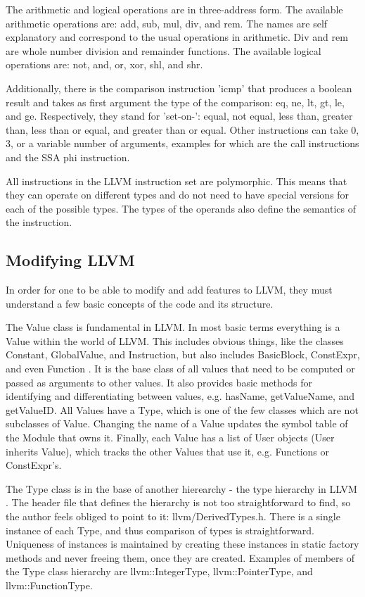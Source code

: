 \documentclass[parskip]{cs4rep}
\begin{document}
The arithmetic and logical operations are in three-address form. The available arithmetic operations are: add, sub, mul, div, and rem. The names are self explanatory and correspond to the usual operations in arithmetic. Div and rem are whole number division and remainder functions. The available logical operations are: not, and, or, xor, shl, and shr.

Additionally, there is the comparison instruction 'icmp' that produces a boolean result and takes as first argument the type of the comparison: eq, ne, lt, gt, le, and ge. Respectively, they stand for 'set-on-': equal, not equal, less than, greater than, less than or equal, and greater than or equal. Other instructions can take 0, 3, or a variable number of arguments, examples for which are the call instructions and the SSA phi instruction.

All instructions in the LLVM instruction set are polymorphic. This means that they can operate on different types and do not need to have special versions for each of the possible types. The types of the operands also define the semantics of the instruction.

\subsection{Modifying LLVM}

In order for one to be able to modify and add features to LLVM, they must understand a few basic concepts of the code and its structure.

The Value class is fundamental in LLVM. In most basic terms everything is a Value within the world of LLVM. This includes obvious things, like the classes Constant, GlobalValue, and Instruction, but also includes BasicBlock, ConstExpr, and even Function \cite{P9}. It is the base class of all values that need to be computed or passed as arguments to other values. It also provides basic methods for identifying and differentiating between values, e.g. hasName, getValueName, and getValueID. All Values have a Type, which is one of the few classes which are not subclasses of Value. Changing the name of a Value updates the symbol table of the Module that owns it. Finally, each Value has a list of User objects (User inherits Value), which tracks the other Values that use it, e.g. Functions or ConstExpr's.

The Type class is in the base of another hierearchy - the type hierarchy in LLVM \cite{P10}. The header file that defines the hierarchy is not too straightforward to find, so the author feels obliged to point to it: llvm/DerivedTypes.h. There is a single instance of each Type, and thus comparison of types is straightforward. Uniqueness of instances is maintained by creating these instances in static factory methods and never freeing them, once they are created. Examples of members of the Type class hierarchy are llvm::IntegerType, llvm::PointerType, and llvm::FunctionType.
\end{document}
